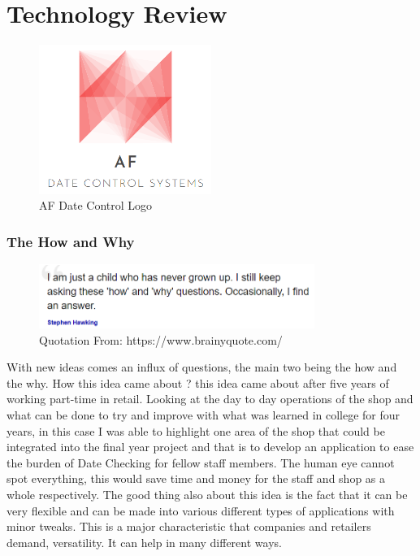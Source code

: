 \chapter{Technology Review}

\begin{figure}[h!]
	\caption{AF Date Control Logo}
	\label{image:AF-Date-Control}
	\centering
	\includegraphics[width=0.50\textwidth]{images/AF-Date-Control.png}
\end{figure}

\subsection{The How and Why}
\begin{figure}[h!]
	\caption{Quotation From: https://www.brainyquote.com/}
	\label{image:quote1}
	\centering
	\includegraphics[width=0.8\textwidth]{images/quote1.PNG}
\end{figure}

With new ideas comes an influx of questions, the main two being the how and the why. How this idea came about ? this idea came about after five years of working part-time in retail. Looking at the day to day operations of the shop and what can be done to try and improve with what was learned in college for four years, in this case I was able to highlight one area of the shop that could be integrated into the final year project and that is to develop an application to ease the burden of Date Checking for fellow staff members. The human eye cannot spot everything, this would save time and money for the staff and shop as a whole respectively. The good thing also about this idea is the fact that it can be very flexible and can be made into various different types of applications with minor tweaks. This is a major characteristic that companies and retailers demand, versatility. It can help in many different ways.
\newline

